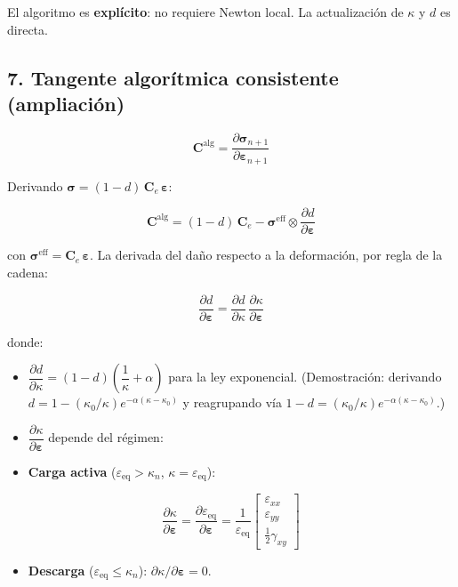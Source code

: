 \documentclass[11pt,letterpaper,oneside]{report}
\begin{document}
El algoritmo es \textbf{explícito}: no requiere Newton local. La actualización de $\kappa$ y $d$ es directa.

\subsection{7. Tangente algorítmica consistente (ampliación)}

\[
\mathbf C^\text{alg} = \frac{\partial \boldsymbol\sigma_{n+1}}{\partial \boldsymbol\varepsilon_{n+1}}
\]

Derivando $\boldsymbol\sigma = (1-d)\,\mathbf C_e\,\boldsymbol\varepsilon$:

\[
\mathbf C^\text{alg} = (1-d)\,\mathbf C_e - \boldsymbol\sigma^\text{eff} \otimes \frac{\partial d}{\partial \boldsymbol\varepsilon}
\]

con $\boldsymbol\sigma^\text{eff} = \mathbf C_e\,\boldsymbol\varepsilon$. La derivada del daño respecto a la deformación, por regla de la cadena:

\[
\frac{\partial d}{\partial \boldsymbol\varepsilon} = \frac{\partial d}{\partial \kappa}\,\frac{\partial \kappa}{\partial \boldsymbol\varepsilon}
\]

donde:

\begin{itemize}
  \item $\dfrac{\partial d}{\partial \kappa} = (1 - d)\left(\dfrac{1}{\kappa} + \alpha\right)$ para la ley exponencial. (Demostración: derivando $d = 1 - (\kappa_0/\kappa)e^{-\alpha(\kappa-\kappa_0)}$ y reagrupando vía $1 - d = (\kappa_0/\kappa)e^{-\alpha(\kappa-\kappa_0)}$.)
\end{itemize}

\begin{itemize}
  \item $\dfrac{\partial \kappa}{\partial \boldsymbol\varepsilon}$ depende del régimen:
  \item \textbf{Carga activa} ($\varepsilon_\text{eq} > \kappa_n$, $\kappa = \varepsilon_\text{eq}$):
\end{itemize}
    \[
\dfrac{\partial \kappa}{\partial \boldsymbol\varepsilon} = \dfrac{\partial \varepsilon_\text{eq}}{\partial \boldsymbol\varepsilon} = \dfrac{1}{\varepsilon_\text{eq}}\begin{bmatrix}\varepsilon_{xx} \\ \varepsilon_{yy} \\ \tfrac{1}{2}\gamma_{xy}\end{bmatrix}
\]
\begin{itemize}
  \item \textbf{Descarga} ($\varepsilon_\text{eq} \leq \kappa_n$): $\partial \kappa / \partial \boldsymbol\varepsilon = 0$.
\end{itemize}
\end{document}
